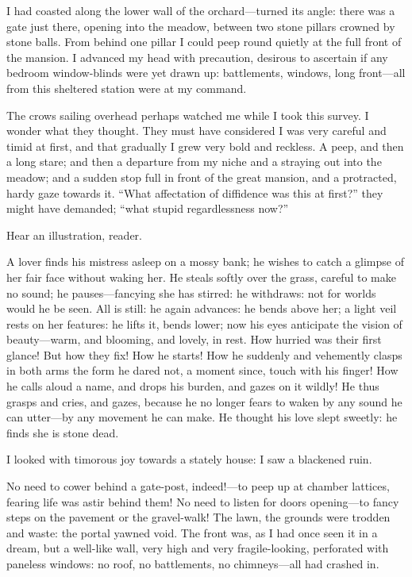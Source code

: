 I had coasted along the lower wall of the orchard---turned its angle:
there was a gate just there, opening into the meadow, between two stone
pillars crowned by stone balls. From behind one pillar I could peep
round quietly at the full front of the mansion. I advanced my head with
precaution, desirous to ascertain if any bedroom window-blinds were yet
drawn up: battlements, windows, long front---all from this sheltered
station were at my command.

The crows sailing overhead perhaps watched me while I took this survey.
I wonder what they thought. They must have considered I was very
careful and timid at first, and that gradually I grew very bold and
reckless. A peep, and then a long stare; and then a departure from my
niche and a straying out into the meadow; and a sudden stop full in
front of the great mansion, and a protracted, hardy gaze towards it.
\enquote{What affectation of diffidence was this at first?} they might
have demanded; \enquote{what stupid regardlessness now?}

Hear an illustration, reader.

A lover finds his mistress asleep on a mossy bank; he wishes to catch a
glimpse of her fair face without waking her. He steals softly over the
grass, careful to make no sound; he pauses---fancying she has stirred:
he withdraws: not for worlds would he be seen. All is still: he again
advances: he bends above her; a light veil rests on her features: he
lifts it, bends lower; now his eyes anticipate the vision of
beauty---warm, and blooming, and lovely, in rest. How hurried was their
first glance! But how they fix! How he starts! How he suddenly and
vehemently clasps in both arms the form he dared not, a moment since,
touch with his finger! How he calls aloud a name, and drops his burden,
and gazes on it wildly! He thus grasps and cries, and gazes, because he
no longer fears to waken by any sound he can utter---by any movement he
can make. He thought his love slept sweetly: he finds she is stone
dead.

I looked with timorous joy towards a stately house: I saw a blackened
ruin.

No need to cower behind a gate-post, indeed!---to peep up at chamber
lattices, fearing life was astir behind them! No need to listen for
doors opening---to fancy steps on the pavement or the gravel-walk! The
lawn, the grounds were trodden and waste: the portal yawned void. The
front was, as I had once seen it in a dream, but a well-like wall, very
high and very fragile-looking, perforated with paneless windows: no
roof, no battlements, no chimneys---all had crashed in.

